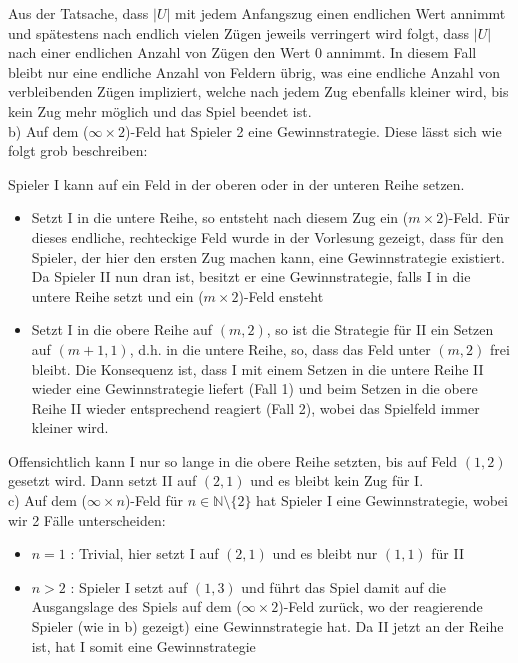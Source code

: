 \documentclass{scrartcl}
\begin{document}
Aus der Tatsache, dass $|U|$ mit jedem Anfangszug einen endlichen Wert annimmt und spätestens nach
endlich vielen Zügen jeweils verringert wird folgt, dass $|U|$ nach einer endlichen Anzahl von
Zügen den Wert 0 annimmt. In diesem Fall bleibt nur eine endliche Anzahl von Feldern übrig, was
eine endliche Anzahl von verbleibenden Zügen impliziert, welche nach jedem Zug ebenfalls kleiner
wird, bis kein Zug mehr möglich und das Spiel beendet ist. \\

b) Auf dem ($\infty \times 2$)-Feld hat Spieler 2 eine Gewinnstrategie. Diese lässt sich wie folgt
grob beschreiben:

Spieler I kann auf ein Feld in der oberen oder in der unteren Reihe setzen.
\begin{itemize}
\item{Setzt I in die untere Reihe, so entsteht nach diesem Zug ein ($m \times 2$)-Feld. Für dieses
endliche, rechteckige Feld wurde in der Vorlesung gezeigt, dass für den Spieler, der hier den
ersten Zug machen kann, eine Gewinnstrategie existiert. Da Spieler II nun dran ist, besitzt er
eine Gewinnstrategie, falls I in die untere Reihe setzt und ein ($m \times 2$)-Feld ensteht}
\item{Setzt I in die obere Reihe auf $(m, 2)$, so ist die Strategie für II ein Setzen auf 
$(m+1, 1)$, d.h. in die untere Reihe, so, dass das Feld unter $(m, 2)$ frei bleibt. Die Konsequenz
ist, dass I mit einem Setzen in die untere Reihe II wieder eine Gewinnstrategie liefert (Fall 1) und
beim Setzen in die obere Reihe II wieder entsprechend reagiert (Fall 2), wobei das Spielfeld immer
kleiner wird.}
\end{itemize}

Offensichtlich kann I nur so lange in die obere Reihe setzten, bis auf Feld $(1,2)$ gesetzt wird. Dann
setzt II auf $(2,1)$ und es bleibt kein Zug für I. \\

c) Auf dem ($\infty \times n$)-Feld für $n \in \mathbb{N} \setminus \{2\}$ hat Spieler I eine
Gewinnstrategie, wobei wir 2 Fälle unterscheiden:
\begin{itemize}
\item{$n = 1$ : Trivial, hier setzt I auf $(2,1)$ und es bleibt nur $(1,1)$ für II}
\item{$n > 2$ : Spieler I setzt auf $(1,3)$ und führt das Spiel damit auf die Ausgangslage des
Spiels auf dem ($\infty \times 2$)-Feld zurück, wo der reagierende Spieler (wie in b) gezeigt) eine 
Gewinnstrategie hat. Da II jetzt an der Reihe ist, hat I somit eine Gewinnstrategie}
\end{itemize}
\end{document}
